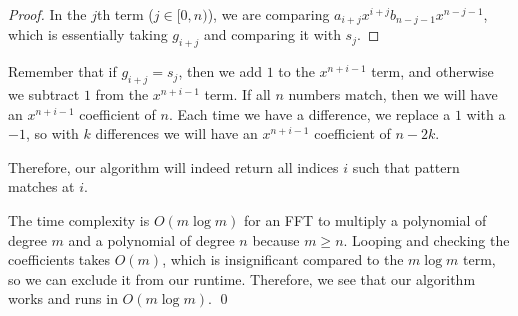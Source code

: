 \documentclass{article}
\begin{document}
\begin{enumerate}[label = \alph*)]
\begin{proof}
		In the $j$th term ($j \in [0, n)$), we are comparing $a_{i+j}x^{i+j} b_{n-j-1}x^{n-j-1}$, which is essentially taking $g_{i+j}$ and comparing it with $s_{j}$. 
	\end{proof}

	Remember that if $g_{i+j} = s_j$, then we add $1$ to the $x^{n+i-1}$ term, and otherwise we subtract $1$ from the $x^{n+i-1}$ term. If all $n$ numbers match, then we will have an $x^{n+i-1}$ coefficient of $n$. Each time we have a difference, we replace a $1$ with a $-1$, so with $k$ differences we will have an $x^{n+i-1}$ coefficient of $n - 2k$.

	Therefore, our algorithm will indeed return all indices $i$ such that pattern matches at $i$.

	The time complexity is $O(m \log m)$ for an FFT to multiply a polynomial of degree $m$ and a polynomial of degree $n$ because $m \geq n$. Looping and checking the coefficients takes $O(m)$, which is insignificant compared to the $m \log m$ term, so we can exclude it from our runtime. Therefore, we see that our algorithm works and runs in $O(m \log m)$. \qed
\end{enumerate}
\end{document}
